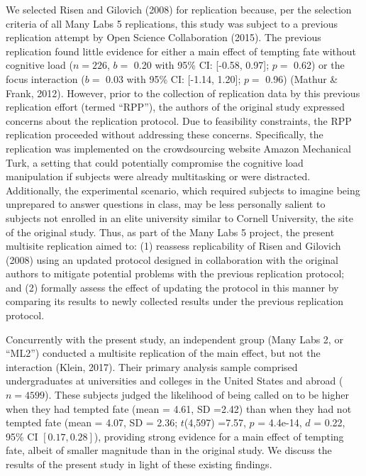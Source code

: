 \documentclass[english,floatsintext,man]{apa6}
\newcounter{author}
\theoremstyle{definition}
\theoremstyle{definition}
\theoremstyle{definition}
\theoremstyle{remark}
\begin{document}
We selected Risen and Gilovich (2008) for replication because, per the
selection criteria of all Many Labs 5 replications, this study was
subject to a previous replication attempt by Open Science Collaboration
(2015). The previous replication found little evidence for either a main
effect of tempting fate without cognitive load (\(n=226\), \(b=\) 0.20
with 95\% CI: {[}-0.58, 0.97{]}; \(p=\) 0.62) or the focus interaction
(\(b=\) 0.03 with 95\% CI: {[}-1.14, 1.20{]}; \(p=\) 0.96) (Mathur \&
Frank, 2012). However, prior to the collection of replication data by
this previous replication effort (termed \enquote{RPP}), the authors of
the original study expressed concerns about the replication protocol.
Due to feasibility constraints, the RPP replication proceeded without
addressing these concerns. Specifically, the replication was implemented
on the crowdsourcing website Amazon Mechanical Turk, a setting that
could potentially compromise the cognitive load manipulation if subjects
were already multitasking or were distracted. Additionally, the
experimental scenario, which required subjects to imagine being
unprepared to answer questions in class, may be less personally salient
to subjects not enrolled in an elite university similar to Cornell
University, the site of the original study. Thus, as part of the Many
Labs 5 project, the present multisite replication aimed to: (1) reassess
replicability of Risen and Gilovich (2008) using an updated protocol
designed in collaboration with the original authors to mitigate
potential problems with the previous replication protocol; and (2)
formally assess the effect of updating the protocol in this manner by
comparing its results to newly collected results under the previous
replication protocol.

Concurrently with the present study, an independent group (Many Labs 2,
or \enquote{ML2}) conducted a multisite replication of the main effect,
but not the interaction (Klein, 2017). Their primary analysis sample
comprised undergraduates at universities and colleges in the United
States and abroad (\(n=4599\)). These subjects judged the likelihood of
being called on to be higher when they had tempted fate (mean = 4.61, SD
=2.42) than when they had not tempted fate (mean = 4.07, SD = 2.36;
\(t\)(4,597) =7.57, \(p\) = 4.4e-14, \(d\) = 0.22, 95\% CI
\([0.17, 0.28]\)), providing strong evidence for a main effect of
tempting fate, albeit of smaller magnitude than in the original study.
We discuss the results of the present study in light of these existing
findings.
\end{document}
